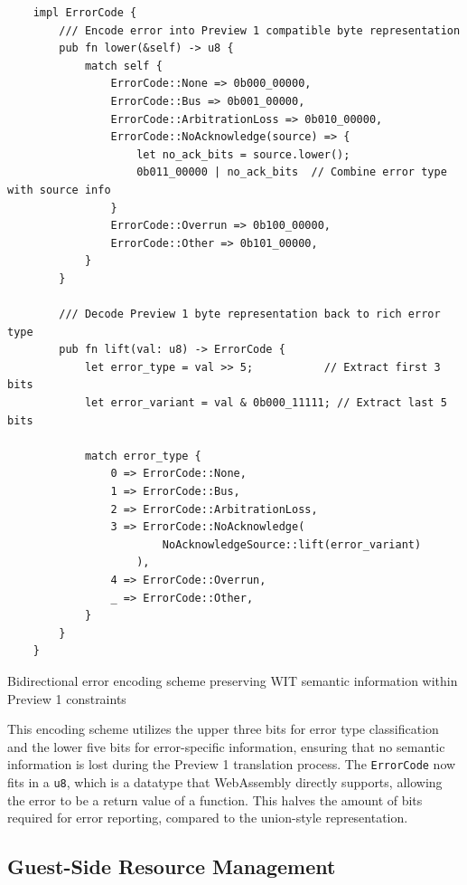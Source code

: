\begin{listing}[H]
    \begin{verbatim}
    impl ErrorCode {
        /// Encode error into Preview 1 compatible byte representation
        pub fn lower(&self) -> u8 {
            match self {
                ErrorCode::None => 0b000_00000,
                ErrorCode::Bus => 0b001_00000,
                ErrorCode::ArbitrationLoss => 0b010_00000,
                ErrorCode::NoAcknowledge(source) => {
                    let no_ack_bits = source.lower();
                    0b011_00000 | no_ack_bits  // Combine error type with source info
                }
                ErrorCode::Overrun => 0b100_00000,
                ErrorCode::Other => 0b101_00000,
            }
        }
    
        /// Decode Preview 1 byte representation back to rich error type
        pub fn lift(val: u8) -> ErrorCode {
            let error_type = val >> 5;           // Extract first 3 bits
            let error_variant = val & 0b000_11111; // Extract last 5 bits
            
            match error_type {
                0 => ErrorCode::None,
                1 => ErrorCode::Bus,
                2 => ErrorCode::ArbitrationLoss,
                3 => ErrorCode::NoAcknowledge(
                        NoAcknowledgeSource::lift(error_variant)
                    ),
                4 => ErrorCode::Overrun,
                _ => ErrorCode::Other,
            }
        }
    }
    \end{verbatim}
    \caption{Bidirectional error encoding scheme preserving WIT semantic information within Preview 1 constraints}
    \label{lst:error-encoding}
\end{listing}

This encoding scheme utilizes the upper three bits for error type classification and the lower five bits for error-specific information, ensuring that no semantic information is lost during the Preview 1 translation process. The \texttt{ErrorCode} now fits in a \texttt{u8}, which is a datatype that WebAssembly directly supports, allowing the error to be a return value of a function. This halves the amount of bits required for error reporting, compared to the union-style representation.

\subsection{Guest-Side Resource Management}

